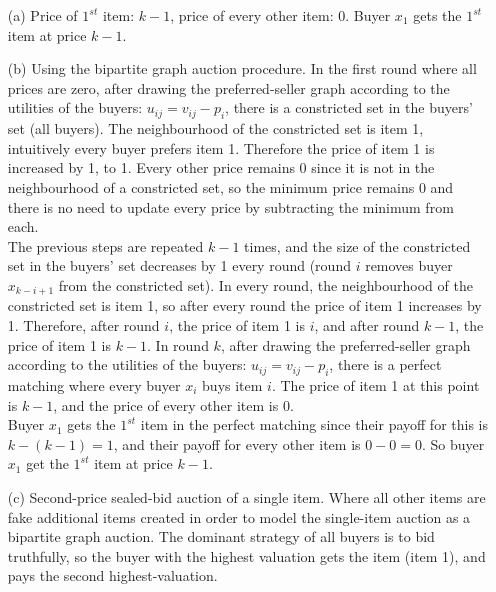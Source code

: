 \documentclass{article}
\begin{document}
\begin{enumerate}
	\begin{enumerate}
		\item[(a)] Price of $1^{st}$ item: $k-1$, price of every other item: $0$. Buyer $x_1$ gets the $1^{st}$ item at price $k-1$. 
		\item[(b)] Using the bipartite graph auction procedure. 
		In the first round where all prices are zero, 
		after drawing the preferred-seller graph according to the utilities of the buyers: $u_{ij} = v_{ij} - p_i$, 
		there is a constricted set in the buyers' set (all buyers). 
		The neighbourhood of the constricted set is item 1, intuitively every buyer prefers item 1. 
		Therefore the price of item 1 is increased by 1, to 1. 
		Every other price remains 0 since it is not in the neighbourhood of a constricted set, 
		so the minimum price remains 0 and there is no need to update every price by subtracting the minimum from each. \\
		The previous steps are repeated $k-1$ times, and the size of the constricted set in the buyers' set decreases by 1 every round 
		(round $i$ removes buyer $x_{k-i+1}$ from the constricted set). 
		In every round, the neighbourhood of the constricted set is item 1, so after every round the price of item 1 increases by 1. 
		Therefore, after round $i$, the price of item 1 is $i$, and after round $k-1$, the price of item 1 is $k-1$. 
		In round $k$, after drawing the preferred-seller graph according to the utilities of the buyers: $u_{ij} = v_{ij} - p_i$, 
		there is a perfect matching where every buyer $x_i$ buys item $i$. 
		The price of item 1 at this point is $k-1$, and the price of every other item is $0$. \\
		Buyer $x_1$ gets the $1^{st}$ item in the perfect matching since their payoff for this is $k-(k-1)=1$, 
		and their payoff for every other item is $0-0=0$. 
		So buyer $x_1$ get the $1^{st}$ item at price $k-1$. 
		\item[(c)] Second-price sealed-bid auction of a single item. 
		Where all other items are fake additional items created in order to model the single-item auction as a bipartite graph auction. 
		The dominant strategy of all buyers is to bid truthfully, 
		so the buyer with the highest valuation gets the item (item 1), and pays the second highest-valuation. 
	\end{enumerate}


\end{enumerate}
\end{document}

